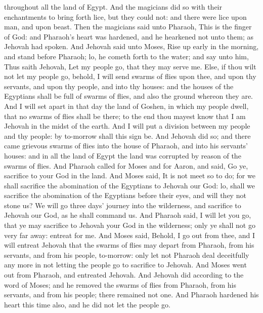 throughout all the land of Egypt. And the magicians did so with their enchantments to bring forth lice, but they could not: and there were lice upon man, and upon beast. Then the magicians said unto Pharaoh, This is the finger of God: and Pharaoh’s heart was hardened, and he hearkened not unto them; as Jehovah had spoken.  And Jehovah said unto Moses, Rise up early in the morning, and stand before Pharaoh; lo, he cometh forth to the water; and say unto him, Thus saith Jehovah, Let my people go, that they may serve me. Else, if thou wilt not let my people go, behold, I will send swarms of flies upon thee, and upon thy servants, and upon thy people, and into thy houses: and the houses of the Egyptians shall be full of swarms of flies, and also the ground whereon they are. And I will set apart in that day the land of Goshen, in which my people dwell, that no swarms of flies shall be there; to the end thou mayest know that I am Jehovah in the midst of the earth. And I will put a division between my people and thy people: by to-morrow shall this sign be. And Jehovah did so; and there came grievous swarms of flies into the house of Pharaoh, and into his servants’ houses: and in all the land of Egypt the land was corrupted by reason of the swarms of flies.  And Pharaoh called for Moses and for Aaron, and said, Go ye, sacrifice to your God in the land. And Moses said, It is not meet so to do; for we shall sacrifice the abomination of the Egyptians to Jehovah our God: lo, shall we sacrifice the abomination of the Egyptians before their eyes, and will they not stone us? We will go three days’ journey into the wilderness, and sacrifice to Jehovah our God, as he shall command us. And Pharaoh said, I will let you go, that ye may sacrifice to Jehovah your God in the wilderness; only ye shall not go very far away: entreat for me. And Moses said, Behold, I go out from thee, and I will entreat Jehovah that the swarms of flies may depart from Pharaoh, from his servants, and from his people, to-morrow: only let not Pharaoh deal deceitfully any more in not letting the people go to sacrifice to Jehovah. And Moses went out from Pharaoh, and entreated Jehovah. And Jehovah did according to the word of Moses; and he removed the swarms of flies from Pharaoh, from his servants, and from his people; there remained not one. And Pharaoh hardened his heart this time also, and he did not let the people go. 

